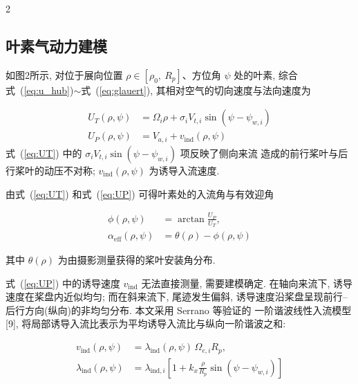 \documentclass{aas}
\begin{document}
\begin{multicols}{2}%
\subsection{叶素气动力建模}
\label{subsec:rotation}
\label{subsec:blade_element}

如图2所示, 对位于展向位置 $\rho\in[\rho_0,\ R_p]$、方位角 $\psi$ 处的叶素, 综合
式~(\ref{eq:u_hub})$\sim$式~(\ref{eq:glauert}), 其相对空气的切向速度与法向速度为

\begin{align}
U_T(\rho,\psi)&=\Omega_i\rho+\sigma_i V_{t,i}\sin\!\left(\psi-\psi_{w,i}\right) \label{eq:UT}\\[2pt]
U_P(\rho,\psi)&=V_{a,i}+v_{\mathrm{ind}}(\rho,\psi) \label{eq:UP}
\end{align}
式~(\ref{eq:UT}) 中的 $\sigma_i V_{t,i}\sin(\psi-\psi_{w,i})$ 项反映了侧向来流
造成的前行桨叶与后行桨叶的动压不对称; $v_{\mathrm{ind}}(\rho,\psi)$
为诱导入流速度.

由式~(\ref{eq:UT}) 和式~(\ref{eq:UP}) 可得叶素处的入流角与有效迎角

\begin{equation}
\begin{aligned}
\phi(\rho,\psi)&=\arctan\frac{U_P}{U_T},\\
\alpha_{\mathrm{eff}}(\rho,\psi)&=\theta(\rho)-\phi(\rho,\psi)
\end{aligned}
\label{eq:aoa}
\end{equation}

其中 $\theta(\rho)$ 为由摄影测量获得的桨叶安装角分布. 

\label{subsec:induced}

式~(\ref{eq:UP}) 中的诱导速度 $v_{\mathrm{ind}}$ 无法直接测量, 需要建模确定.
在轴向来流下, 诱导速度在桨盘内近似均匀; 而在斜来流下, 尾迹发生偏斜,
诱导速度沿桨盘呈现前行--后行方向(纵向)的非均匀分布. 本文采用 Serrano 等验证的
一阶谐波线性入流模型[9], 将局部诱导入流比表示为平均诱导入流比与纵向一阶谐波之和:

\begin{equation}
\begin{aligned}
v_{\mathrm{ind}}(\rho,\psi)&=\lambda_{\mathrm{ind}}(\rho,\psi)\,\Omega_{e,i}R_p,\\
\lambda_{\mathrm{ind}}(\rho,\psi)&=\lambda_{\mathrm{ind},i}\left[1+k_x\frac{\rho}{R_p}\sin\!\left(\psi-\psi_{w,i}\right)\right]
\end{aligned}
\label{eq:ind_vel}
\end{equation}


\end{multicols}
\end{document}
